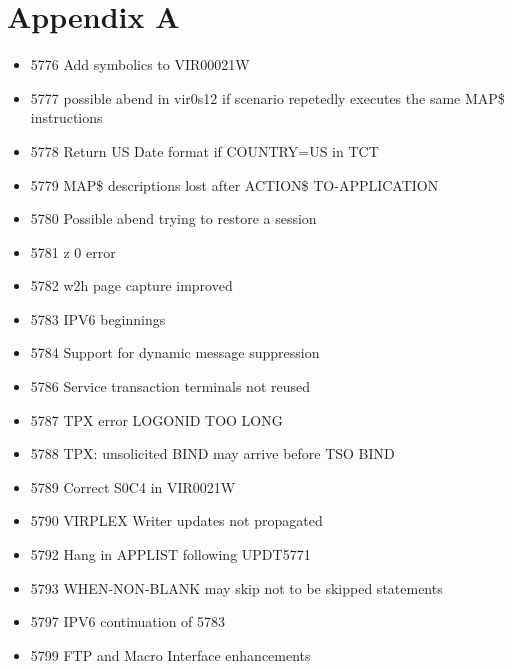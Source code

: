 \documentclass[letterpaper,10pt,english]{sphinxmanual}
\begin{document}
\chapter{Appendix A}
\label{\detokenize{TN202003:appendix-a}}
\begin{itemize}
\item {} 
5776 Add symbolics to VIR00021W

\item {} 
5777 possible abend in vir0s12 if scenario repetedly executes the same MAP\$ instructions

\item {} 
5778 Return US Date format if COUNTRY=US in TCT

\item {} 
5779 MAP\$ descriptions lost after ACTION\$ TO-APPLICATION

\item {} 
5780 Possible abend trying to restore a session

\item {} 
5781 z 0 error

\item {} 
5782 w2h page capture improved

\item {} 
5783 IPV6 beginnings

\item {} 
5784 Support for dynamic message suppression

\item {} 
5786 Service transaction terminals not reused

\item {} 
5787 TPX error LOGONID TOO LONG

\item {} 
5788 TPX: unsolicited BIND may arrive before TSO BIND

\item {} 
5789 Correct S0C4 in VIR0021W

\item {} 
5790 VIRPLEX Writer updates not propagated

\item {} 
5792 Hang in APPLIST following UPDT5771

\item {} 
5793 WHEN-NON-BLANK may skip not to be skipped statements

\item {} 
5797 IPV6 continuation of 5783

\item {} 
5799 FTP and Macro Interface enhancements


\end{itemize}
\end{document}
